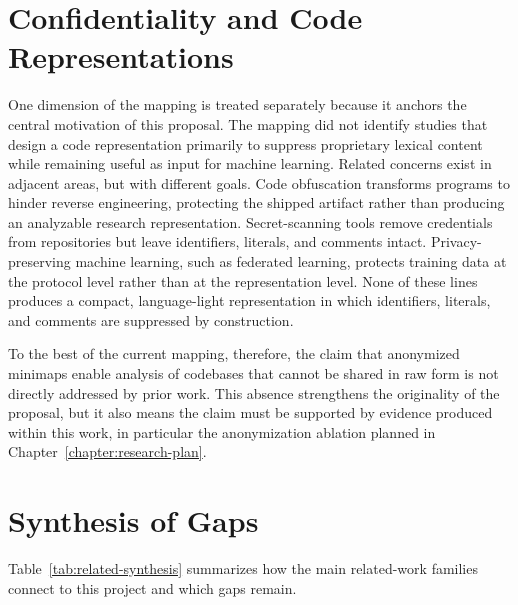 \section{Confidentiality and Code Representations}

One dimension of the mapping is treated separately because it anchors the
central motivation of this proposal. The mapping did not identify studies that
design a code representation primarily to suppress proprietary lexical content
while remaining useful as input for machine learning. Related concerns exist in
adjacent areas, but with different goals. Code obfuscation transforms programs
to hinder reverse engineering, protecting the shipped artifact rather than
producing an analyzable research representation. Secret-scanning tools remove
credentials from repositories but leave identifiers, literals, and comments
intact. Privacy-preserving machine learning, such as federated learning,
protects training data at the protocol level rather than at the representation
level. None of these lines produces a compact, language-light representation in
which identifiers, literals, and comments are suppressed by construction.

To the best of the current mapping, therefore, the claim that anonymized
minimaps enable analysis of codebases that cannot be shared in raw form is not
directly addressed by prior work. This absence strengthens the originality of
the proposal, but it also means the claim must be supported by evidence
produced within this work, in particular the anonymization ablation planned in
Chapter~\ref{chapter:research-plan}.

\section{Synthesis of Gaps}

Table~\ref{tab:related-synthesis} summarizes how the main related-work families
connect to this project and which gaps remain.

